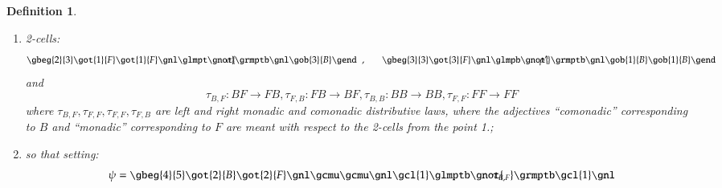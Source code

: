 \documentclass[a4paper, 12pt]{article}
\renewcommand{\_}[1]{\mbox{$_{\left( #1 \right)}$}}
\theoremstyle{plain}
\newtheorem{defn}[thm]{Definition}
\begin{document}
\begin{defn}
\begin{enumerate}
\begin{equation}
\gob{3}{F}
\gend, \hspace{0,6cm}
\gbeg{2}{3}
\got{1}{B} \gnl
\grcm \gnl
\gob{1}{B} \gob{1}{F}
\gend, \hspace{0,6cm}
\gbeg{2}{3}
\got{1}{B} \got{1}{F} \gnl
\grmo \gcl{1} \gnl 
\gob{1}{B}
\gend, \hspace{0,6cm}
\gbeg{2}{3}
\got{3}{F} \gnl
\grmo \gvac{1} \gcl{1} \gnl
\gob{1}{B} \gob{1}{F}
\gend
\end{equation}
so that 
$\gbeg{2}{1}
\glm \gnl
\gend$ makes $F$ a proper left $B$-module and 
$\gbeg{2}{1}
\grcm \gnl
\gend$ makes $B$ a proper right $F$-comodule, and the following relations are fulfilled: 
$$
\gbeg{2}{3}
\got{1}{B} \got{1}{F} \gnl
\glm \gnl
\gvac{1} \gcu{1}
\gend=
\gbeg{2}{3}
\got{1}{B} \got{1}{F} \gnl
\gcl{1} \gcl{1} \gnl
\gcu{1} \gcu{1} \gnl
\gend,
\hspace{0,8cm}
\gbeg{2}{3}
\gu{1} \gnl
\grcm \gnl
\gob{1}{B} \gob{1}{F}
\gend=
\gbeg{2}{3}
\gu{1} \gu{1} \gnl
\gcl{1} \gcl{1} \gnl
\gob{1}{B} \gob{1}{F}
\gend,
\hspace{1,4cm}
\gbeg{2}{3}
\got{1}{B} \got{1}{F} \gnl
\grmo \gcl{1} \gnl 
\gcu{1}
\gend=
\gbeg{2}{3}
\got{1}{B} \got{1}{F} \gnl
\gcl{1} \gcl{1} \gnl
\gcu{1} \gcu{1} \gnl
\gend,
\hspace{0,8cm}
\gbeg{2}{3}
\gvac{1} \gu{1} \gnl
\grmo \gvac{1} \gcl{1} \gnl
\gob{1}{B} \gob{1}{F}
\gend=
\gbeg{2}{3}
\gu{1} \gu{1} \gnl
\gcl{1} \gcl{1} \gnl
\gob{1}{B} \gob{1}{F}
\gend
$$
\item 2-cells: 
$$
\gbeg{2}{3}
\got{1}{F} \got{1}{F} \gnl
\glmpt \gnot{\hspace{-0,34cm}\sigma} \grmptb \gnl
\gob{3}{B}
\gend \hspace{0,2cm}, \hspace{0,6cm}
\gbeg{3}{3}
\got{3}{F} \gnl
\glmpb \gnot{\hspace{-0,34cm}\rho'} \grmptb \gnl
\gob{1}{B}\gob{1}{B}
\gend
$$
and 
$$\tau_{B,F}:BF\to FB, \tau_{F,B}:FB\to BF, \tau_{B,B}:BB\to BB, \tau_{F,F}:FF\to FF$$
where $\tau_{B,F}, \tau_{F,F}, \tau_{F,F}, \tau_{F,B}$ are left and right monadic and comonadic distributive laws, where the adjectives ``comonadic'' corresponding to $B$ 
and ``monadic'' corresponding to $F$ are meant with respect to the 2-cells from the point 1.;  
\item so that setting: 
$$
\psi=
\gbeg{4}{5}
\got{2}{B} \got{2}{F} \gnl
\gcmu \gcmu \gnl
\gcl{1} \glmptb \gnot{\hspace{-0,34cm}\tau_{B,F}} \grmptb \gcl{1} \gnl
$$
\end{enumerate}
\end{defn}
\end{document}
